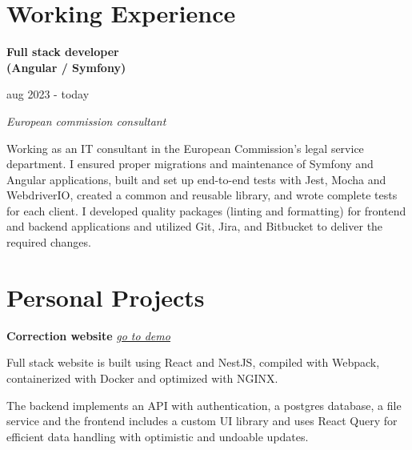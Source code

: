 \documentclass[11pt, oneside, a4paper, titlepage]{article}
\begin{document}
\begin{tcolorbox}[colframe=white, colback=white]
\begin{minipage}[t]{0.35\linewidth}
  \end{minipage}
  \hfill
  \begin{minipage}[t]{0.60\linewidth}

    \section*{Working Experience}

    \begin{minipage}{0.45\linewidth}
      \textbf{Full stack developer} \\ 
      \textbf{(Angular / Symfony)}
    \end{minipage}
    \begin{minipage}{0.5\linewidth}
      \begin{flushright}
        aug 2023 - today
      \end{flushright}
    \end{minipage}
    \vspace{0.2cm}

    \emph{European commission consultant} 
    \vspace{0.2cm}

    \small{
      Working as an IT consultant in the European Commission's legal 
      service department. I ensured proper migrations and maintenance of Symfony 
      and Angular applications, built and set up end-to-end tests with Jest, 
      Mocha and WebdriverIO, created a common and reusable library, and wrote complete 
      tests for each client. \medbreak
      I developed quality packages (linting and formatting) for frontend and 
      backend applications and utilized Git, Jira, and Bitbucket to deliver the 
      required changes.
    }

    \section*{Personal Projects 
      \small{}
    }

    \textbf{Correction website} 
    \emph{
      \href{https://tamighi.github.io/correction-demo/}{\underline{go to demo}}
    }
    \medbreak

    \small{
      Full stack website is built using React and NestJS, compiled 
      with Webpack, containerized with Docker and optimized with NGINX.

      The backend implements an API with authentication, a postgres database, 
      a file service and the frontend includes a custom UI library and 
      uses React Query for efficient data handling with optimistic and 
      undoable updates.
    }
    \vspace{0.3cm}


\end{minipage}
\end{tcolorbox}
\end{document}
